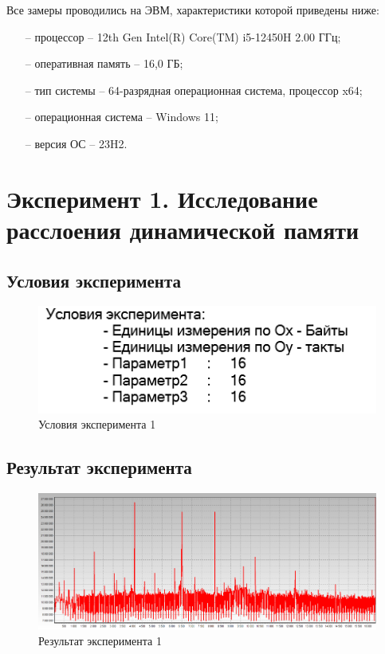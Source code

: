 \documentclass{article}
\begin{document}
Все замеры проводились на ЭВМ, характеристики которой приведены ниже:

\begin{itemize}
	\item [--] процессор -- 12th Gen Intel(R) Core(TM) i5-12450H   2.00 ГГц;
	\item [--] оперативная память -- 16,0 ГБ;
	\item [--] тип системы -- 64-разрядная операционная система, процессор x64;
	\item [--] операционная система -- Windows 11;
	\item [--] версия ОС -- 23H2.
\end{itemize}

\clearpage\section{Эксперимент 1. Исследование расслоения динамической памяти}
\subsection{Условия эксперимента}
\begin{figure}[h]
	\centering
	\includegraphics[scale=0.7]{tools/in_1.png}
	\caption{Условия эксперимента 1}
\end{figure}

\subsection{Результат эксперимента}
\begin{figure}[h]
	\centering
	\includegraphics[scale=0.4]{tools/exp_1.png}
	\caption{Результат эксперимента 1}
\end{figure}
\end{document}
